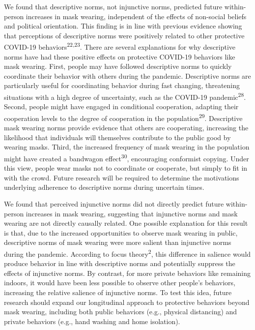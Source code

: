 \documentclass[
  man, donotrepeattitle,floatsintext]{apa6}
\begin{document}
We found that descriptive norms, not injunctive norms, predicted future within-person increases in mask wearing, independent of the effects of non-social beliefs and political orientation. This finding is in line with previous evidence showing that perceptions of descriptive norms were positively related to other protective COVID-19 behaviors\textsuperscript{22,23}. There are several explanations for why descriptive norms have had these positive effects on protective COVID-19 behaviors like mask wearing. First, people may have followed descriptive norms to quickly coordinate their behavior with others during the pandemic. Descriptive norms are particularly useful for coordinating behavior during fast changing, threatening situations with a high degree of uncertainty, such as the COVID-19 pandemic\textsuperscript{28}. Second, people might have engaged in conditional cooperation, adapting their cooperation levels to the degree of cooperation in the population\textsuperscript{29}. Descriptive mask wearing norms provide evidence that others are cooperating, increasing the likelihood that individuals will themselves contribute to the public good by wearing masks. Third, the increased frequency of mask wearing in the population might have created a bandwagon effect\textsuperscript{30}, encouraging conformist copying. Under this view, people wear masks not to coordinate or cooperate, but simply to fit in with the crowd. Future research will be required to determine the motivations underlying adherence to descriptive norms during uncertain times.

We found that perceived injunctive norms did not directly predict future within-person increases in mask wearing, suggesting that injunctive norms and mask wearing are not directly causally related. One possible explanation for this result is that, due to the increased opportunities to observe mask wearing in public, descriptive norms of mask wearing were more salient than injunctive norms during the pandemic. According to focus theory\textsuperscript{2}, this difference in salience would produce behavior in line with descriptive norms and potentially suppress the effects of injunctive norms. By contrast, for more private behaviors like remaining indoors, it would have been less possible to observe other people's behaviors, increasing the relative salience of injunctive norms. To test this idea, future research should expand our longitudinal approach to protective behaviors beyond mask wearing, including both public behaviors (e.g., physical distancing) and private behaviors (e.g., hand washing and home isolation).
\end{document}
